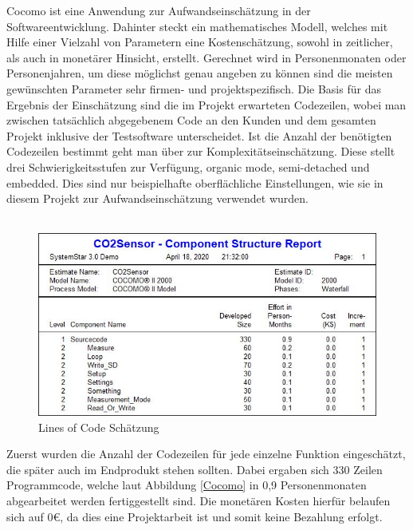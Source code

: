 \label{Cocomo}
Cocomo ist eine Anwendung zur Aufwandseinschätzung in der Softwareentwicklung. Dahinter steckt ein mathematisches Modell, welches mit Hilfe einer Vielzahl von  Parametern eine Kostenschätzung, sowohl in zeitlicher, als auch in monetärer Hinsicht, erstellt. Gerechnet wird in Personenmonaten oder Personenjahren, um diese möglichst genau angeben zu können sind die meisten gewünschten Parameter sehr firmen- und projektspezifisch. Die Basis für das Ergebnis der Einschätzung sind die im Projekt erwarteten Codezeilen, wobei man zwischen tatsächlich abgegebenem Code an den Kunden und dem gesamten Projekt inklusive der Testsoftware unterscheidet. Ist die Anzahl der benötigten Codezeilen bestimmt geht man über zur Komplexitätseinschätzung. Diese stellt drei Schwierigkeitsstufen zur Verfügung, organic mode, semi-detached und embedded. Dies sind nur beispielhafte oberflächliche Einstellungen, wie sie in diesem Projekt zur Aufwandseinschätzung 
verwendet wurden. \\ \\

\begin{figure}[!hbt]
	\centering
	\includegraphics[width=0.9\linewidth]{Images/CocomoSchaetzung}
	\caption{Lines of Code Schätzung}
	\label{fig:Cocomo}
\end{figure}

Zuerst wurden die Anzahl der Codezeilen für jede einzelne Funktion eingeschätzt, die später auch im Endprodukt stehen sollten. Dabei ergaben sich 330 Zeilen Programmcode, welche laut Abbildung \ref{Cocomo} in 0,9 Personenmonaten abgearbeitet werden fertiggestellt sind. Die monetären Kosten hierfür belaufen sich auf 0€, da dies eine Projektarbeit ist und somit keine Bezahlung erfolgt.